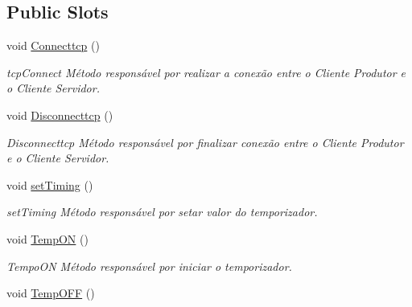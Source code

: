 \subsection*{Public Slots}
\begin{DoxyCompactItemize}
\item 
\mbox{\label{class_main_window_aea419351969ceb1745bce8c32cc40898}} 
void \mbox{\hyperlink{class_main_window_aea419351969ceb1745bce8c32cc40898}{Connecttcp}} ()
\begin{DoxyCompactList}\small\item\em tcp\+Connect Método responsável por realizar a conexão entre o Cliente Produtor e o Cliente Servidor. \end{DoxyCompactList}\item 
\mbox{\label{class_main_window_ad194178551f1276153573dadbd16cfe4}} 
void \mbox{\hyperlink{class_main_window_ad194178551f1276153573dadbd16cfe4}{Disconnecttcp}} ()
\begin{DoxyCompactList}\small\item\em Disconnecttcp Método responsável por finalizar conexão entre o Cliente Produtor e o Cliente Servidor. \end{DoxyCompactList}\item 
\mbox{\label{class_main_window_a380872c4aa4095322c798c8ea0ed357e}} 
void \mbox{\hyperlink{class_main_window_a380872c4aa4095322c798c8ea0ed357e}{set\+Timing}} ()
\begin{DoxyCompactList}\small\item\em set\+Timing Método responsável por setar valor do temporizador. \end{DoxyCompactList}\item 
\mbox{\label{class_main_window_a6c6f436be38f1b757ca1378596e4f65d}} 
void \mbox{\hyperlink{class_main_window_a6c6f436be38f1b757ca1378596e4f65d}{Temp\+ON}} ()
\begin{DoxyCompactList}\small\item\em Tempo\+ON Método responsável por iniciar o temporizador. \end{DoxyCompactList}\item 
\mbox{\label{class_main_window_a4c7f4a0aea66c32ce97ad252109b4247}} 
void \mbox{\hyperlink{class_main_window_a4c7f4a0aea66c32ce97ad252109b4247}{Temp\+O\+FF}} ()

\end{DoxyCompactItemize}

